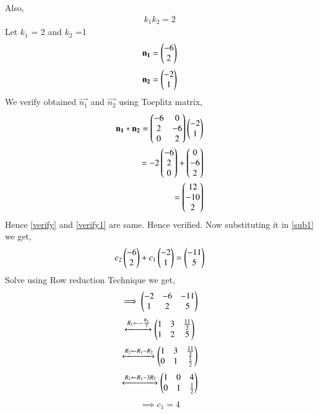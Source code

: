 \documentclass[journal,12pt,twocolumn]{IEEEtran}
\begin{document}
Also,
\begin{align}
k_1k_2 = 2
\end{align}
Let $k_1$ = 2 and $k_2$ =1
\begin{align}
\mathbf{n_1} = \begin{pmatrix}-6\\2\end{pmatrix}
\label{n1}
\end{align}
\begin{align}
\mathbf{n_2} = \begin{pmatrix}-2\\1\end{pmatrix}
\label{n2}
\end{align}
We verify obtained $\vec{n_1}$ and $\vec{n_2}$ using Toeplitz matrix,
\begin{align}
\mathbf{n_1}*\mathbf{n_2} = \begin{pmatrix}-6&0\\2 &-6\\0&2\end{pmatrix}\begin{pmatrix}-2\\1\end{pmatrix}\\
=-2\begin{pmatrix}-6\\2\\0\end{pmatrix}+\begin{pmatrix}0\\-6\\2\end{pmatrix}\\
=\begin{pmatrix}12\\-10\\2\end{pmatrix}
\label{verify1}
\end{align}
Hence \eqref{verify} and \eqref{verify1} are same. Hence verified. 
Now substituting it in \eqref{sub1} we get,
\begin{align}
c_2\begin{pmatrix}-6\\2\end{pmatrix}+c_1\begin{pmatrix}-2\\1\end{pmatrix} = \begin{pmatrix}-11\\5\end{pmatrix}
\end{align}
Solve using Row reduction Technique we get,
\begin{align}
\implies\begin{pmatrix}-2&-6&-11\\1&2&5\end{pmatrix} 
\end{align}
\begin{align}
\xleftrightarrow[]{R_1\leftarrow -\frac{R_1}{2}}\begin{pmatrix}1&3&\frac{11}{2}\\1&2&5\end{pmatrix}
\end{align}
\begin{align}
\xleftrightarrow[]{R_2\leftarrow R_1-R_2}\begin{pmatrix}1&3&\frac{11}{2}\\0&1&\frac{1}{2}\end{pmatrix}
\end{align}
\begin{align}
\xleftrightarrow[]{R_1\leftarrow R_1-3R_2}\begin{pmatrix}1&0&4\\0&1&\frac{1}{2}\end{pmatrix}
\end{align}
\begin{align}
\implies c_1 = 4
\end{align}
\end{document}
